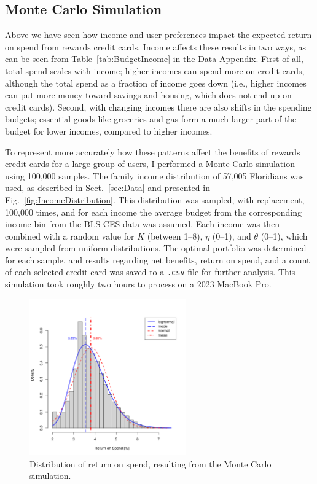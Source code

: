 \clearpage
\subsection{Monte Carlo Simulation}

Above we have seen how income and user preferences impact the expected return on spend from rewards credit cards.
Income affects these results in two ways, as can be seen from Table~\ref{tab:BudgetIncome} in the Data Appendix.
First of all, total spend scales with income; higher incomes can spend more on credit cards, although the total spend as a fraction of income goes down (i.e., higher incomes can put more money toward savings and housing, which does not end up on credit cards).
Second, with changing incomes there are also shifts in the spending budgets; essential goods like groceries and gas form a much larger part of the budget for lower incomes, compared to higher incomes. 

To represent more accurately how these patterns affect the benefits of rewards credit cards for a large group of users, I performed a Monte Carlo simulation using 100,000 samples. 
The family income distribution of 57,005 Floridians was used, as described in Sect.~\ref{sec:Data} and presented in Fig.~\ref{fig:IncomeDistribution}.
This distribution was sampled, with replacement, 100,000 times, and for each income the  average budget from the corresponding income bin from the BLS CES data was assumed. 
Each income was then combined with a random value for $K$ (between 1--8), $\eta$ (0--1), and $\theta$ (0--1), which were sampled from uniform distributions.
The optimal portfolio was determined for each sample, and results regarding net benefits, return on spend, and a count of each selected credit card was saved to a \texttt{.csv} file for further analysis. 
This simulation took roughly two hours to process on a 2023 MacBook Pro.

\begin{figure}[t!bh]
    \begin{center}
    \includegraphics[width=0.6\textwidth]{../Figures/MC_ROS_Histogram.pdf}
    \caption{Distribution of return on spend, resulting from the Monte Carlo simulation.}
    \label{fig:MC_ROS_Histogram}
    \end{center}
\end{figure}

